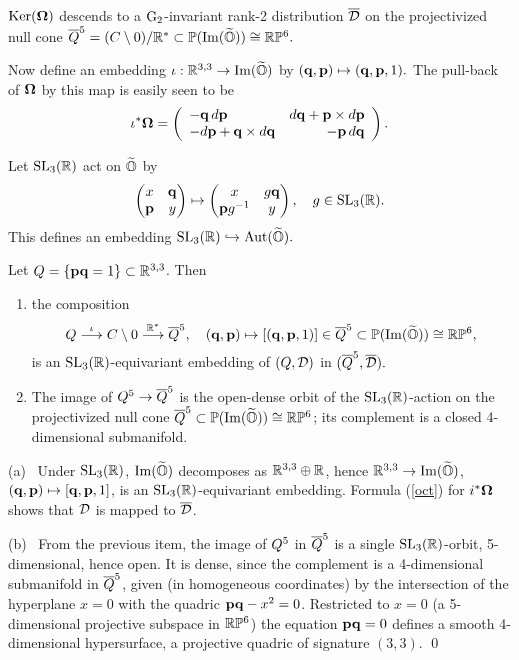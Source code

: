 \begin{cor} ${\rm Ker}(\boldsymbol{\Omega})$ descends to a ${\rm G}_2$-invariant rank-2  distribution $\overline{\mathcal D}$ on the projectivized null cone $\overline{Q}^5=(C\setminus 0)/\mathbb{R}^*\subset \mathbb{P}( {\rm Im}(\widetilde{\mathbb O}))\cong\mathbb{R}\mathbb{P}^6.$ 
\end{cor}


Now define an  embedding  $\iota:\mathbb{R}^{3,3}\to {\rm Im}(\widetilde{\mathbb O})$ by $(\mathbf q,{\mathbf p})\mapsto (\mathbf q,{\mathbf p},1).$ The pull-back of $\boldsymbol{\Omega}$ by this map is easily seen to be
\begin{equation}\label{oct}
\iota^*\boldsymbol{\Omega}=\left(\begin{array}{lr}
-\mathbf q \,d{\mathbf p} & 
d\mathbf q +{\mathbf p}\times d{\mathbf p}\\  
-d{\mathbf p}+
 \mathbf q\times d\mathbf q&
-{\mathbf p} \,d\mathbf q\end{array}
\right).
\end{equation}

Let ${\mathrm{SL}_3(\mathbb{R})}$ act on $\widetilde{\mathbb O}$ by 
$$ \left(\begin{matrix}x&\mathbf q \\ {\mathbf p}&y\end{matrix}\right)\mapsto
 \left(\begin{matrix}x&g\mathbf q \\ {\mathbf p} g^{-1}&y\end{matrix}\right), \quad g\in{\mathrm{SL}_3(\mathbb{R})}.$$
%
 This defines an embedding ${\mathrm{SL}_3(\mathbb{R})}\hookrightarrow {\rm Aut}(\widetilde{\mathbb O}).$  
\begin{theorem} Let $Q=\{{\mathbf p}\mathbf q=1\}\subset\mathbb{R}^{3,3}$. Then 
\begin{enumerate}[leftmargin=18pt,label=(\alph*)]\setlength\itemsep{5pt}
\item the composition $$Q\stackrel{\iota}{\longrightarrow} C\setminus 0\stackrel{\mathbb{R}^*}{\longrightarrow}  \overline{Q}^5,\quad (\mathbf q,{\mathbf p})\mapsto [(\mathbf q,{\mathbf p},1)]\in\overline{Q}^5\subset \mathbb{P}({\rm Im}(\widetilde{\mathbb O}))\cong\mathbb{R}\mathbb{P}^6,$$
is an ${\mathrm{SL}_3(\mathbb{R})}$-equivariant embedding of  $(Q,{\mathcal D})$ in $(\overline{Q}^5,\overline{\mathcal D}).$ 

\item The image of $Q^5\to\overline{Q}^5$ is the  open-dense orbit of the ${\mathrm{SL}_3(\mathbb{R})}$-action on the projectivized null cone $\overline{Q}^5\subset \mathbb{P}({\rm Im}(\widetilde{\mathbb O}))\cong\mathbb{R}\mathbb{P}^6$; its complement is a closed 4-dimensional  submanifold. 
\end{enumerate}

\end{theorem}

\sn\pf
(a) \,  Under ${\mathrm{SL}_3(\mathbb{R})}$, ${\rm Im}(\widetilde{\mathbb O})$ decomposes as $\mathbb{R}^{3,3}\oplus \mathbb{R}$, hence $\mathbb{R}^{3,3}\to{\rm Im}(\widetilde{\mathbb O})$, $(\mathbf q,{\mathbf p})\mapsto [\mathbf q,{\mathbf p},1]$, is an ${\mathrm{SL}_3(\mathbb{R})}$-equivariant embedding. Formula (\ref{oct}) for $i^*\boldsymbol{\Omega}$ shows that ${\mathcal D}$ is mapped to $\overline{\mathcal D}$. 

\sn (b) \,  From the previous item, the image of $Q^5$ in $\overline{Q}^5$ is a single ${\mathrm{SL}_3(\mathbb{R})}$-orbit,  5-dimensional, hence open. It is dense, since the complement is a  4-dimensional submanifold in $\overline{Q}^5$, given (in homogeneous coordinates) by the intersection of the hyperplane $x=0$ with the quadric ${\mathbf p}\mathbf q-x^2=0$. Restricted to $x=0$ (a 5-dimensional projective subspace in $\mathbb{R}\mathbb{P}^6$) the equation ${\mathbf p}\mathbf q=0$ defines a smooth 4-dimensional   hypersurface, a projective quadric of signature $(3,3)$. 
\qed

